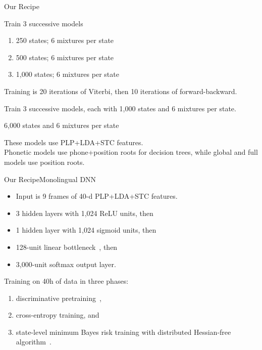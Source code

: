 \begin{frame}{Our Recipe}{}
  \begin{description} 
  \item[Phonetic mixup] Train 3 successive models
    \begin{enumerate}
    \item 250 states; 6 mixtures per state
    \item 500 states; 6 mixtures per state
    \item 1,000 states; 6 mixtures per state
    \end{enumerate}
    Training is 20 iterations of Viterbi, then 10 iterations of
    forward-backward.
  \item[Global mixup] Train 3 successive models, each with 1,000
    states and 6 mixtures per state.
  \item[Full model] 6,000 states and 6 mixtures per state
  \end{description}
  \vfill
  These models use PLP+LDA+STC features. \\
  Phonetic models use phone+position roots for decision trees, while
  global and full models use position roots.
\end{frame}

\begin{frame}{Our Recipe}{Monolingual DNN}
  \begin{itemize}
  \item Input is 9 frames of 40-d PLP+LDA+STC features.
  \item 3 hidden layers with 1,024 ReLU units, then
  \item 1 hidden layer with 1,024 sigmoid units, then
  \item 128-unit linear bottleneck~\cite{Sainath2013}, then
  \item 3,000-unit softmax output layer.
  \end{itemize}
  \vfill
  Training on 40h of data in three phases:
  \begin{enumerate}
  \item discriminative pretraining~\cite{Seide2011},
  \item cross-entropy training, and
  \item state-level minimum Bayes risk training with distributed
    Hessian-free algorithm~\cite{Kingsbury2012}.
  \end{enumerate}
\end{frame}

